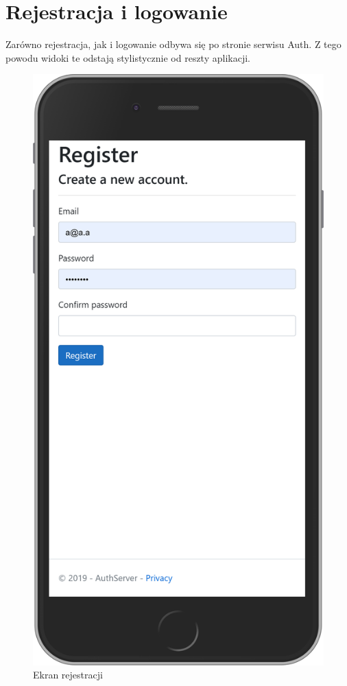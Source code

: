 \section{Rejestracja i logowanie}
	Zarówno rejestracja, jak i logowanie odbywa się po stronie serwisu Auth.
	Z tego powodu widoki te odstają stylistycznie od reszty aplikacji.
	\begin{figure}[H]
		\centering
		\begin{minipage}{.5\textwidth}
			\centering
			\includegraphics[width=0.75\linewidth]{rys06/register.png}
			\caption{Ekran rejestracji}
		\end{minipage}%
		\begin{minipage}{0.5\textwidth}
			\centering

\end{minipage}
\end{figure}
